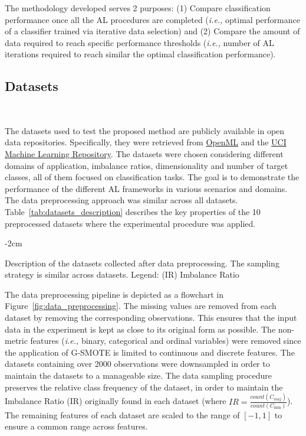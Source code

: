 \documentclass[parskip=full]{scrartcl}
\begin{document}
The methodology developed serves 2 purposes: (1) Compare classification
performance once all the AL procedures are completed (\textit{i.e.,} optimal
performance of a classifier trained via iterative data selection) and (2)
Compare the amount of data required to reach specific performance thresholds
(\textit{i.e.,} number of AL iterations required to reach similar the optimal
classification performance).

\subsection{Datasets}~\label{sec:datasets}

The datasets used to test the proposed method are publicly available in open
data repositories. Specifically, they were retrieved from
\href{https://www.openml.org/}{OpenML} and the
\href{https://archive.ics.uci.edu/}{UCI Machine Learning Repository}. The
datasets were chosen considering different domains of application, imbalance
ratios, dimensionality and number of target classes, all of them focused on
classification tasks. The goal is to demonstrate the performance of the
different AL frameworks in various scenarios and domains. The data
preprocessing approach was similar across all datasets.
Table~\ref{tab:datasets_description} describes the key properties of the 10
preprocessed datasets where the experimental procedure was applied. 

\begin{table}[H]
    \centering
    \addtolength{\leftskip} {-2cm}
    \addtolength{\rightskip}{-2cm}
    \caption{\label{tab:datasets_description}
        Description of the datasets collected after data preprocessing. The
        sampling strategy is similar across datasets. Legend: (IR) Imbalance
        Ratio
    }
\end{table}

The data preprocessing pipeline is depicted as a flowchart in
Figure~\ref{fig:data_preprocessing}. The missing values are removed from each
dataset by removing the corresponding observations. This ensures that the
input data in the experiment is kept as close to its original form as
possible. The non-metric features (\textit{i.e.,} binary, categorical and
ordinal variables) were removed since the application of G-SMOTE is limited to
continuous and discrete features. The datasets containing over 2000
observations were downsampled in order to maintain the datasets to a
manageable size. The data sampling procedure preserves the relative class
frequency of the dataset, in order to maintain the Imbalance Ratio (IR)
originally found in each dataset (where $IR =
\frac{count(C_{maj})}{count(C_{\min})}$). The remaining features of each
dataset are scaled to the range of $[-1, 1]$ to ensure a common range across
features.
\end{document}
